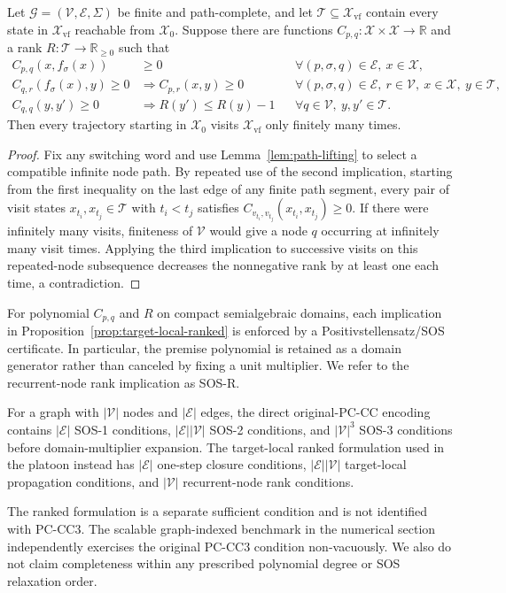 \begin{proposition}\label{prop:target-local-ranked}
Let $\mathcal G=(\mathcal V,\mathcal E,\Sigma)$ be finite and path-complete, and let $\mathcal T\subseteq\mathcal X_{\mathrm{vf}}$ contain every state in $\mathcal X_{\mathrm{vf}}$ reachable from $\mathcal X_0$. Suppose there are functions $C_{p,q}:\mathcal X\times\mathcal X\to\mathbb R$ and a rank $R:\mathcal T\to\mathbb R_{\ge0}$ such that
\begin{align*}
C_{p,q}(x,f_\sigma(x))&\ge0 &&\forall (p,\sigma,q)\in\mathcal E,\ x\in\mathcal X,\\
C_{q,r}(f_\sigma(x),y)\ge0&\Longrightarrow C_{p,r}(x,y)\ge0
&&\forall (p,\sigma,q)\in\mathcal E,\ r\in\mathcal V,\ x\in\mathcal X,\ y\in\mathcal T,\\
C_{q,q}(y,y')\ge0&\Longrightarrow R(y')\le R(y)-1
&&\forall q\in\mathcal V,\ y,y'\in\mathcal T.
\end{align*}
Then every trajectory starting in $\mathcal X_0$ visits $\mathcal X_{\mathrm{vf}}$ only finitely many times.
\end{proposition}
\begin{proof}
Fix any switching word and use Lemma~\ref{lem:path-lifting} to select a compatible infinite node path. By repeated use of the second implication, starting from the first inequality on the last edge of any finite path segment, every pair of visit states $x_{t_i},x_{t_j}\in\mathcal T$ with $t_i<t_j$ satisfies $C_{v_{t_i},v_{t_j}}(x_{t_i},x_{t_j})\ge0$. If there were infinitely many visits, finiteness of $\mathcal V$ would give a node $q$ occurring at infinitely many visit times. Applying the third implication to successive visits on this repeated-node subsequence decreases the nonnegative rank by at least one each time, a contradiction.
\end{proof}

For polynomial $C_{p,q}$ and $R$ on compact semialgebraic domains, each implication in Proposition~\ref{prop:target-local-ranked} is enforced by a Positivstellensatz/SOS certificate. In particular, the premise polynomial is retained as a domain generator rather than canceled by fixing a unit multiplier. We refer to the recurrent-node rank implication as SOS-R.

For a graph with $|\mathcal V|$ nodes and $|\mathcal E|$ edges, the direct original-PC-CC encoding contains $|\mathcal E|$ SOS-1 conditions, $|\mathcal E||\mathcal V|$ SOS-2 conditions, and $|\mathcal V|^3$ SOS-3 conditions before domain-multiplier expansion. The target-local ranked formulation used in the platoon instead has $|\mathcal E|$ one-step closure conditions, $|\mathcal E||\mathcal V|$ target-local propagation conditions, and $|\mathcal V|$ recurrent-node rank conditions.

The ranked formulation is a separate sufficient condition and is not identified with PC-CC3. The scalable graph-indexed benchmark in the numerical section independently exercises the original PC-CC3 condition non-vacuously. We also do not claim completeness within any prescribed polynomial degree or SOS relaxation order.
